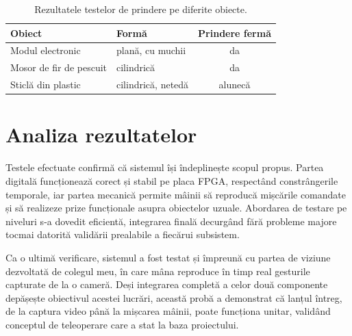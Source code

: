 \begin{table}[H]
\centering
\caption{Rezultatele testelor de prindere pe diferite obiecte.}
\label{tab:grip}
\begin{tabular}{l l c}
\toprule
\textbf{Obiect} & \textbf{Formă} & \textbf{Prindere fermă} \\
\midrule
Modul electronic & plană, cu muchii & da \\
Mosor de fir de pescuit & cilindrică & da \\
Sticlă din plastic & cilindrică, netedă & alunecă \\
\bottomrule
\end{tabular}
\end{table}

\section{Analiza rezultatelor}
\label{sec:testare-analiza}

Testele efectuate confirmă că sistemul își îndeplinește scopul propus. Partea digitală
funcționează corect și stabil pe placa FPGA, respectând constrângerile temporale, iar
partea mecanică permite mâinii să reproducă mișcările comandate și să realizeze prize
funcționale asupra obiectelor uzuale. Abordarea de testare pe niveluri s-a dovedit
eficientă, integrarea finală decurgând fără probleme majore tocmai datorită validării
prealabile a fiecărui subsistem.

Ca o ultimă verificare, sistemul a fost testat și împreună cu partea de viziune dezvoltată
de colegul meu, în care mâna reproduce în timp real gesturile capturate de la o cameră.
Deși integrarea completă a celor două componente depășește obiectivul acestei lucrări,
această probă a demonstrat că lanțul întreg, de la captura video până la mișcarea mâinii,
poate funcționa unitar, validând conceptul de teleoperare care a stat la baza proiectului.

